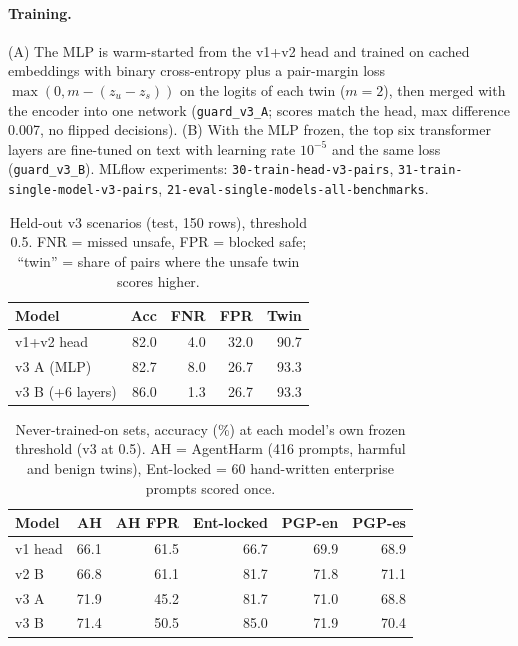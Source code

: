 \documentclass[conference]{IEEEtran}
\begin{document}
\paragraph{Training.} (A) The MLP is warm-started from the v1+v2 head and trained on cached embeddings with binary cross-entropy plus a pair-margin loss $\max(0, m-(z_u-z_s))$ on the logits of each twin ($m{=}2$), then merged with the encoder into one network (\texttt{guard\_v3\_A}; scores match the head, max difference 0.007, no flipped decisions). (B) With the MLP frozen, the top six transformer layers are fine-tuned on text with learning rate $10^{-5}$ and the same loss (\texttt{guard\_v3\_B}). MLflow experiments: \texttt{30-train-head-v3-pairs}, \texttt{31-train-single-model-v3-pairs}, \texttt{21-eval-single-models-all-benchmarks}.
\begin{table}[t]
\centering\caption{Held-out v3 scenarios (test, 150 rows), threshold 0.5. FNR = missed unsafe, FPR = blocked safe; ``twin'' = share of pairs where the unsafe twin scores higher.}\label{tab:v3test}
\begin{tabular}{lrrrr}
\toprule
Model & Acc & FNR & FPR & Twin \\
\midrule
v1+v2 head & 82.0 & 4.0 & 32.0 & 90.7 \\
v3 A (MLP) & 82.7 & 8.0 & 26.7 & 93.3 \\
v3 B (+6 layers) & 86.0 & 1.3 & 26.7 & 93.3 \\
\bottomrule
\end{tabular}
\end{table}
\begin{table}[t]
\centering\caption{Never-trained-on sets, accuracy (\%) at each model's own frozen threshold (v3 at 0.5). AH = AgentHarm (416 prompts, harmful and benign twins), Ent-locked = 60 hand-written enterprise prompts scored once.}\label{tab:v3ext}
\begin{tabular}{lrrrrr}
\toprule
Model & AH & AH FPR & Ent-locked & PGP-en & PGP-es \\
\midrule
v1 head & 66.1 & 61.5 & 66.7 & 69.9 & 68.9 \\
v2 B & 66.8 & 61.1 & 81.7 & 71.8 & 71.1 \\
v3 A & 71.9 & 45.2 & 81.7 & 71.0 & 68.8 \\
v3 B & 71.4 & 50.5 & 85.0 & 71.9 & 70.4 \\
\bottomrule
\end{tabular}
\end{table}
\end{document}
